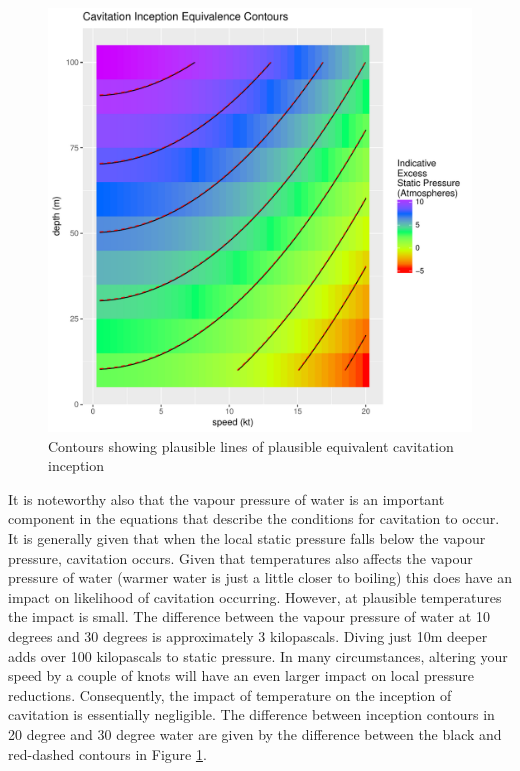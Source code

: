\documentclass{article}\usepackage[]{graphicx}\usepackage[]{color}
\makeatletter
\def\maxwidth{ %
  \ifdim\Gin@nat@width>\linewidth
    \linewidth
  \else
    \Gin@nat@width
  \fi
}
\newenvironment{knitrout}{}{} %
\makeatother
\begin{document}
\begin{figure}
\begin{knitrout}
\color{fgcolor}

{\centering \includegraphics[width=\maxwidth]{figures/plots-plot_inception-1} 

}



\end{knitrout}
\caption{Contours showing plausible lines of plausible equivalent cavitation inception}
\label{fig:InceptionContours}
\end{figure}

It is noteworthy also that the vapour pressure of water is an important component in the equations that describe the conditions for cavitation to occur.  It is generally given that when the local static pressure falls below the vapour pressure, cavitation occurs.  Given that temperatures also affects the vapour pressure of water (warmer water is just a little closer to boiling) this does have an impact on likelihood of cavitation occurring.  However, at plausible temperatures the impact is small.  The difference between the vapour pressure of water at 10 degrees and 30 degrees is approximately 3 kilopascals.  Diving just 10m deeper adds over 100 kilopascals to static pressure.  In many circumstances, altering your speed by a couple of knots will have an even larger impact on local pressure reductions.  Consequently, the impact of temperature on the inception of cavitation is essentially negligible.  The difference between inception contours in 20 degree and 30 degree water are given by the difference between the black and red-dashed contours in Figure \ref{fig:InceptionContours}.
\end{document}
